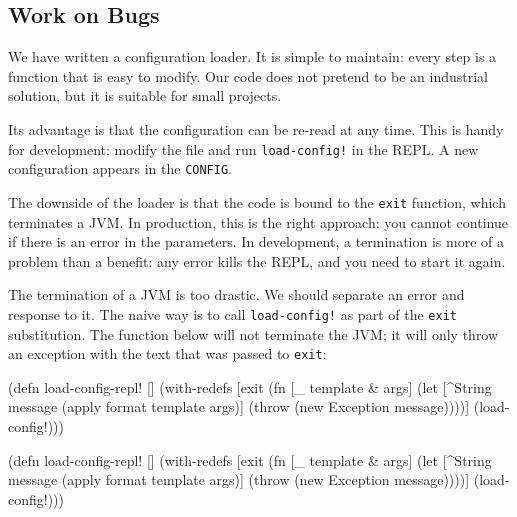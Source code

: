 \fi

\subsection{Work on Bugs}

We have written a configuration loader. It is simple to maintain: every step is a function that is easy to modify.
Our code does not pretend to be an industrial solution, but it is suitable for small projects.

Its advantage is that the configuration can be re-read at any time. This is handy for development: modify the file and run \verb|load-config!| in the REPL. A new configuration appears in the \verb|CONFIG|.


The downside of the loader is that the code is bound to the \verb|exit| function, which terminates a JVM. In production, this is the right approach: you cannot continue if there is an error in the parameters. In development, a termination is more of a problem than a benefit: any error kills the REPL, and you need to start it again.

The termination of a JVM is too drastic. We should separate an error and response to it. The naive way is to call \verb|load-config!| as part of the \verb|exit| substitution. The function below will not terminate the JVM; it will only throw an exception with the text that was passed to \verb|exit|:

\ifx\DEVICETYPE\MOBILE

\begin{english}
  \begin{clojure}
(defn load-config-repl! []
  (with-redefs
    [exit
     (fn [_ template & args]
       (let [^String message
             (apply format
               template args)]
         (throw
           (new Exception message))))]
    (load-config!)))
  \end{clojure}
\end{english}

\else

\begin{english}
  \begin{clojure}
(defn load-config-repl! []
  (with-redefs
    [exit (fn [_ template & args]
            (let [^String message
                  (apply format template args)]
              (throw (new Exception message))))]
    (load-config!)))
  \end{clojure}
\end{english}

